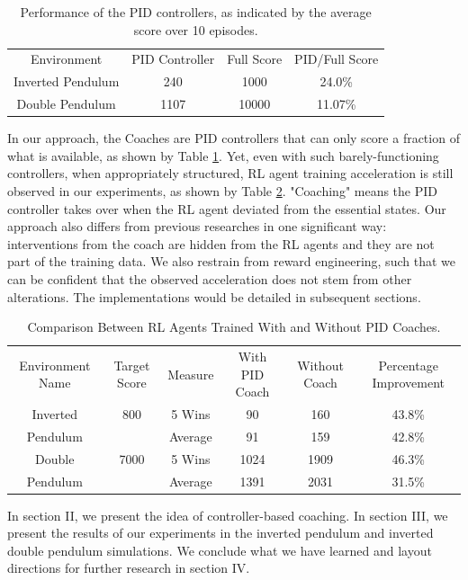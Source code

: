 \documentclass[AMS,STIX1COL]{WileyNJD-v2}
\begin{document}
\begin{table}
\caption{Performance of the PID controllers, as indicated by the average score over 10 episodes.}
\label{score_compare}
\centering
\begin{tabular}{ cccc }
Environment & PID Controller &Full Score &PID\slash Full Score \\
Inverted Pendulum & 240 & 1000& 24.0\%\\
Double Pendulum & 1107 & 10000& 11.07\%\\
\end{tabular}
\end{table}

In our approach, the Coaches are PID controllers that can only score a fraction of what is available, as shown by Table \ref{score_compare}. Yet, even with such barely-functioning controllers, when appropriately structured, RL agent training acceleration is still observed in our experiments, as shown by Table \ref{episode_compare}. "Coaching" means the PID controller takes over when the RL agent deviated from the essential states. Our approach also differs from previous researches in one significant way: interventions from the coach are hidden from the RL agents and they are not part of the training data. We also restrain from reward engineering, such that we can be confident that the observed acceleration does not stem from other alterations. The implementations would be detailed in subsequent sections.

\begin{table}
\caption{Comparison Between RL Agents Trained With and Without PID Coaches.}
\label{episode_compare}
\centering
\begin{tabular}{ cccccc }
Environment Name& Target Score& Measure & With PID Coach& Without Coach& Percentage Improvement\\
Inverted & 800& 5 Wins & 90 & 160& 43.8\% \\
Pendulum & &Average & 91 & 159& 42.8\%\\
Double & 7000& 5 Wins & 1024 & 1909& 46.3\%\\
Pendulum & &Average & 1391 & 2031& 31.5\%\\
\end{tabular}
\end{table}

In section II, we present the idea of controller-based coaching. In section III, we present the results of our experiments in the inverted pendulum and inverted double pendulum simulations. We conclude what we have learned and layout directions for further research in section IV.
\end{document}
